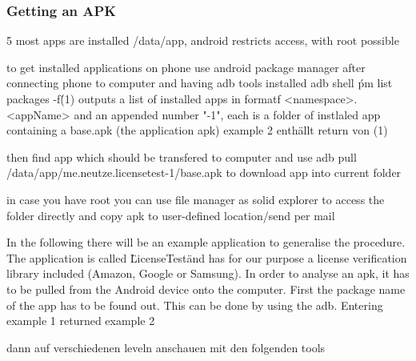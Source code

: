 \subsubsection{Getting an APK}\label{subsubsection:tools-apk}
5
most apps are installed /data/app, android restricts access, with root possible

to get installed applications on phone use android package manager
after connecting phone to computer and having \gls{adb} tools installed
adb shell \'pm list packages -f\' (1)
outputs a list of installed apps in formatf <namespace>.<appName> and an appended number "-1", each is a folder of instlaled app containing a base.apk (the application apk)
example 2 enthällt return von (1)

then find app which should be transfered to computer and use
adb pull /data/app/me.neutze.licensetest-1/base.apk
to download app into current folder

in case you have root you can use file manager as solid explorer to access the folder directly and copy apk to user-defined location/send per mail


\cite{munteanLicense}
%

In the following there will be an example application to generalise the procedure. The application is called \"LicenseTest\" and has for our purpose a license verification library included (Amazon, Google or Samsung).\newline
In order to analyse an \gls{apk}, it has to be pulled from the Android device onto the computer. First the package name of the app has to be found out. This can be done by using the \gls{adb}. Entering example 1 returned example 2

dann auf verschiedenen leveln anschauen mit den folgenden tools
